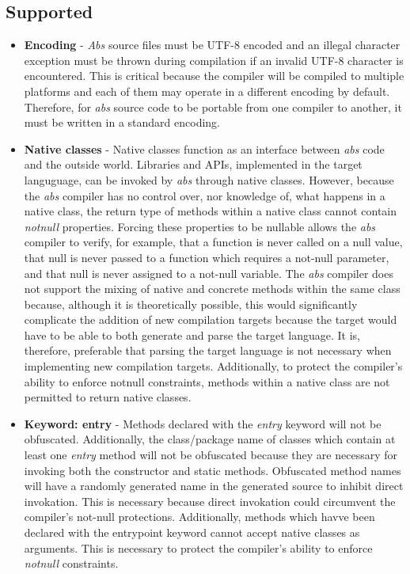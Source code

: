 \documentclass[hidelinks]{article}
\begin{document}
\subsection{Supported}
\begin{itemize}
\item \textbf{Encoding} - \textit{Abs} source files must be UTF-8 encoded and an illegal character exception must be thrown during compilation if an invalid UTF-8 character is encountered. This is critical because the compiler will be compiled to multiple platforms and each of them may operate in a different encoding by default. Therefore, for \textit{abs} source code to be portable from one compiler to another, it must be written in a standard encoding.
\item \textbf{Native classes} - Native classes function as an interface between \textit{abs} code and the outside world. Libraries and APIs, implemented in the target languguage, can be invoked by \textit{abs} through native classes. However, because the \textit{abs} compiler has no control over, nor knowledge of, what happens in a native class, the return type of methods within a native class cannot contain \textit{notnull} properties. Forcing these properties to be nullable allows the \textit{abs} compiler to verify, for example, that a function is never called on a null value, that null is never passed to a function which requires a not-null parameter, and that null is never assigned to a not-null variable. The \textit{abs} compiler does not support the mixing of native and concrete methods within the same class because, although it is theoretically possible, this would significantly complicate the addition of new compilation targets because the target would have to be able to both generate and parse the target language. It is, therefore, preferable that parsing the target language is not necessary when implementing new compilation targets. Additionally, to protect the compiler's ability to enforce notnull constraints, methods within a native class are not permitted to return native classes.
\item \textbf{Keyword: entry} - Methods declared with the \textit{entry} keyword will not be obfuscated. Additionally, the class/package name of classes which contain at least one \textit{entry} method will not be obfuscated because they are necessary for invoking both the constructor and static methods. Obfuscated method names will have a randomly generated name in the generated source to inhibit direct invokation. This is necessary because direct invokation could circumvent the compiler's not-null protections. Additionally, methods which havve been declared with the entrypoint keyword cannot accept native classes as arguments. This is necessary to protect the compiler's ability to enforce \textit{notnull} constraints.

\end{itemize}
\end{document}
